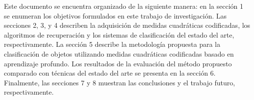 Este documento se encuentra organizado de la siguiente manera: en la sección 1 se enumeran los objetivos formulados en este trabajo de investigación. Las secciones 2, 3, y 4 describen la adquisición de medidas cuadráticas codificadas, los algoritmos de recuperación y los sistemas de clasificación del estado del arte, respectivamente. La sección 5 describe la metodología propuesta para la clasificación de objetos utilizando medidas cuadráticas codificadas basado en aprendizaje profundo. Los resultados de la evaluación del método propuesto comparado con técnicas del estado del arte se presenta en la sección 6. Finalmente, las secciones 7 y 8 muestran las conclusiones y el trabajo futuro, respectivamente. 


